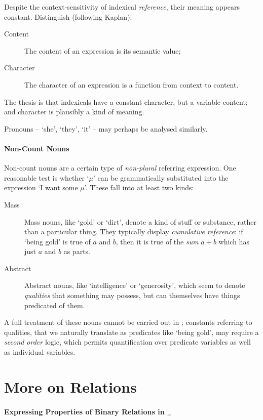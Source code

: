 Despite the context-sensitivity of indexical \emph{reference}, their meaning appears constant. Distinguish (following Kaplan):  \begin{description}
	\item [Content] The content of an expression is its semantic value;
	\item [Character] The character of an expression is a function from context to content.
\end{description} The thesis is that indexicals have a constant character, but a variable content; and character is plausibly a kind of meaning.

Pronouns – `she', `they', `it' – may perhaps be analysed similarly.




\paragraph{Non-Count Nouns}
Non-count nouns are a certain type of \emph{non-plural} referring expression. One reasonable test is whether `$\mu$'  can be grammatically substituted into the expression `I want some $\mu$'. 
 These fall into at least two kinds: \begin{description}
	\item [Mass] Mass nouns, like `gold' or `dirt', denote a kind of stuff or substance, rather than a particular thing. They typically display \emph{cumulative reference}: if `being gold' is true of $a$ and $b$, then it is true of the \emph{sum} $a+b$ which has just $a$ and $b$ as parts.
	\item [Abstract] Abstract nouns, like `intelligence' or `generosity', which seem to denote \emph{qualities} that something may possess, but can themselves have things predicated of them.  
\end{description}
A full treatment of these nouns cannot be carried out in \ltwo; constants referring to qualities, that we naturally translate as predicates like `being gold', may require a \emph{second order} logic, which permits quantification over predicate variables as well as individual variables. 







\section{More on Relations}
 
 \paragraph{Expressing Properties of Binary Relations in \ltwo$_{=}$}
 
